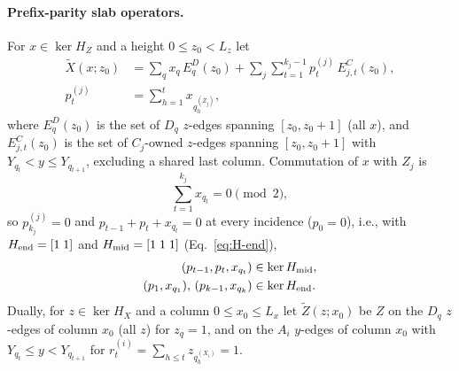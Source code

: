 \documentclass[aps,prx,reprint,superscriptaddress,nofootinbib,floatfix,longbibliography]{revtex4-2}
\theoremstyle{definition}
\begin{document}
\paragraph{Prefix-parity slab operators.}
For $x\in\ker H_Z$ and a height $0\le z_0<L_z$ let
\begin{align}
 \widetilde X(x;z_0)&=\sum_q x_q\,E^D_q(z_0)
 +\sum_j\sum_{t=1}^{k_j-1}p^{(j)}_t\,E^C_{j,t}(z_0),\nonumber\\
 p^{(j)}_t&=\sum_{h=1}^{t}x_{q^{(Z_j)}_h},
 \label{eq:prefix-backbone}
\end{align}
where $E^D_q(z_0)$ is the set of $D_q$ $z$-edges spanning $[z_0,z_0+1]$
(all $x$), and $E^C_{j,t}(z_0)$ is the set of $C_j$-owned $z$-edges
spanning $[z_0,z_0+1]$ with $Y_{q_t}<y\le Y_{q_{t+1}}$, excluding a shared
last column.  Commutation of $x$ with $Z_j$ is
\begin{equation}
 \sum_{t=1}^{k_j}x_{q_t}=0\pmod 2,
 \label{eq:check-even-parity}
\end{equation}
so $p^{(j)}_{k_j}=0$ and $p_{t-1}+p_t+x_{q_t}=0$ at every incidence
($p_0=0$), i.e., with $H_{\rm end}=[1\;1]$ and $H_{\rm mid}=[1\;1\;1]$
(Eq.~\eqref{eq:H-end}),
\begin{align}
 (p_{t-1},p_t,x_{q_t})&\in\ker H_{\rm mid},\nonumber\\
 (p_1,x_{q_1}),\,(p_{k-1},x_{q_k})&\in\ker H_{\rm end}.
 \label{eq:local-prefix-parity}
\end{align}
Dually, for $z\in\ker H_X$ and a column $0\le x_0\le L_x$ let
$\widetilde Z(z;x_0)$ be $Z$ on the $D_q$ $z$-edges of column $x_0$ (all $z$)
for $z_q=1$, and on the $A_i$ $y$-edges of column $x_0$ with
$Y_{q_t}\le y<Y_{q_{t+1}}$ for $r^{(i)}_t=\sum_{h\le t}z_{q_h^{(X_i)}}=1$.
\end{document}
